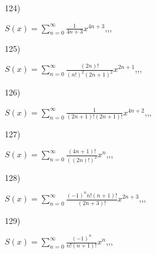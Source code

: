 \documentclass[11pt, ukrainian]{article}
\begin{document}
\par
\vspace{0.9cm}
124) \space 
{%
{$S(x)=\sum\limits_{n=0}^{\infty}{\frac{1}{4n+3}}{x^{{4n+3}}}$},,, \par \smallskip  
}
\par
\vspace{0.9cm}
125) \space 
{%
{$S(x)=\sum\limits_{n=0}^{\infty}{\frac{(2n)!}{{(n!)^2}{(2n+1)^2}}}{x^{{2n+1}}}$},,, \par \smallskip  
}
\par
\vspace{0.9cm}
126) \space 
{%
{$S(x)=\sum\limits_{n=0}^{\infty}{\frac{1}{(2n+1)!(2n+1)!}}{x^{{4n+2}}}$},,, \par \smallskip  
}
\par
\vspace{0.9cm}
127) \space 
{%
{$S(x)=\sum\limits_{n=0}^{\infty}{\frac{(4n+1)!}{((2n)!)^2}}{x^{{n}}}$},,, \par \smallskip  
}
\par
\vspace{0.9cm}
128) \space 
{%
{$S(x)=\sum\limits_{n=0}^{\infty}{\frac{{(-1)^n}n!(n+1)!}{(2n+3)!}}{x^{{2n+3}}}$},,, \par \smallskip  
}
\par
\vspace{0.9cm}
129) \space 
{%
{$S(x)=\sum\limits_{n=0}^{\infty}{\frac{(-1)^n}{n!(n+1)!}}{x^{{n}}}$},,, \par \smallskip  
}
\end{document}
